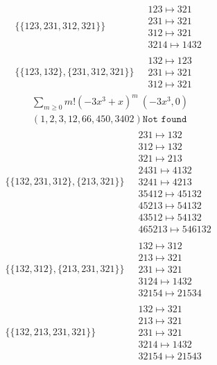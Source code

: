 \begin{scriptsize}
\begin{align}
\begin{matrix}
\end{matrix}
\\
\{\{123, 231, 312, 321\}\}
\ 
&
\begin{matrix}
123 \mapsto 321\\231 \mapsto 321\\312 \mapsto 321\\3214 \mapsto 1432
\end{matrix}
\\
\{\{123, 132\}, \{231, 312, 321\}\}
\ 
&
\begin{matrix}
132 \mapsto 123\\231 \mapsto 321\\312 \mapsto 321
\end{matrix}
\end{align}
$$
\begin{matrix}
\sum_{m \geq 0} m! \left(
-3 x^{3} + x
\right)^m
\ 
\left(-3 x^{3}, 0\right)
\\
\left(1, 2, 3, 12, 66, 450, 3402\right)
\texttt{Not found}
\end{matrix}
$$
\begin{align}
\{\{132, 231, 312\}, \{213, 321\}\}
\ 
&
\begin{matrix}
231 \mapsto 132\\312 \mapsto 132\\321 \mapsto 213\\2431 \mapsto 4132\\3241 \mapsto 4213\\35412 \mapsto 45132\\45213 \mapsto 54132\\43512 \mapsto 54132\\465213 \mapsto 546132
\end{matrix}
\\
\{\{132, 312\}, \{213, 231, 321\}\}
\ 
&
\begin{matrix}
132 \mapsto 312\\213 \mapsto 321\\231 \mapsto 321\\3124 \mapsto 1432\\32154 \mapsto 21534
\end{matrix}
\\
\{\{132, 213, 231, 321\}\}
\ 
&
\begin{matrix}
132 \mapsto 321\\213 \mapsto 321\\231 \mapsto 321\\3214 \mapsto 1432\\32154 \mapsto 21543

\end{matrix}
\end{align}
\end{scriptsize}
